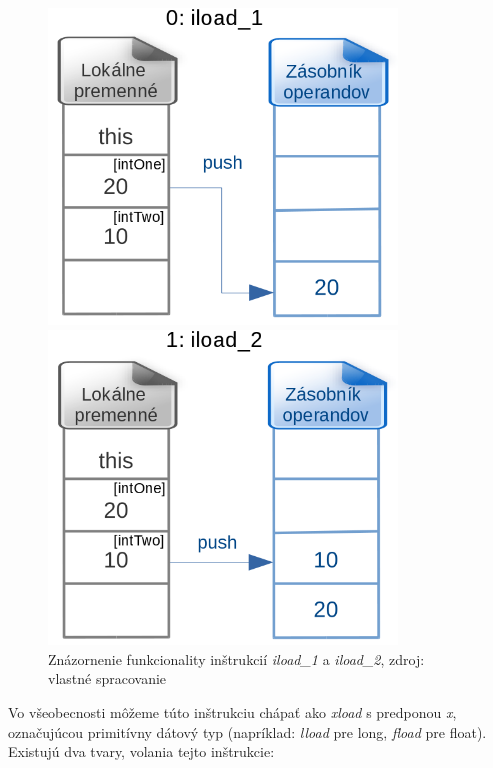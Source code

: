 \documentclass[11pt,final,oneside]{fithesis}
\begin{document}
\begin{figure}[h]
  \begin{minipage}{0.55\textwidth}
     \includegraphics[width=0.825\textwidth]{iload_1.png}
  \end{minipage}
  \begin{minipage}{0.55\textwidth}
     \includegraphics[width=0.825\textwidth]{iload_2.png}
  \end{minipage}
  \caption{Znázornenie funkcionality inštrukcií \textit{iload\_1} a
  \textit{iload\_2}, zdroj: vlastné spracovanie}
  \label{fig:gTiload}
\end{figure}

Vo všeobecnosti môžeme túto inštrukciu chápať ako \textit{xload} s predponou
\textit{x}, označujúcou primitívny dátový typ (napríklad: 
\textit{lload} pre long, \textit{fload} pre float). Existujú dva tvary, volania
tejto inštrukcie: 
\end{document}
